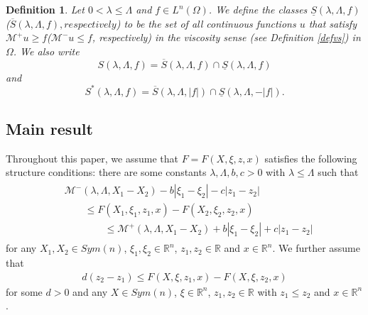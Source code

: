 \documentclass[11pt, reqno]{amsart}
\newtheorem{definition}[theorem]{Definition}
\numberwithin{equation}{section}
\begin{document}
\begin{definition}
Let $0 < \lambda \le \Lambda $ and $f \in L^{n}(\Omega) $.
We define the classes $\underline{S}(\lambda, \Lambda, f) $ ($ \overline{S}(\lambda, \Lambda,  f), respectively$) to be the set of all continuous functions $u$ that satisfy $ \mathcal{M}^{+}u \ge f$($ \mathcal{M}^{-}u \le f$, respectively) in the viscosity sense (see Definition \ref{defvs}) in $\Omega$.
We also write
$$S(\lambda, \Lambda,  f) =\overline{S}(\lambda, \Lambda, f) \cap \underline{S} (\lambda, \Lambda,  f)  $$
and
$$S^{\ast}(\lambda, \Lambda,  f) =\overline{S}(\lambda, \Lambda,| f|) \cap \underline{S} (\lambda, \Lambda,  -|f|) . $$
\end{definition}


\subsection{Main result}
Throughout this paper, we assume that $F=F(X,\xi,z,x)$ satisfies the following structure conditions:
there are some constants $\lambda, \Lambda, b,c>0$ with
$\lambda \le \Lambda$ such that
\begin{align} \label{ob_sc} \begin{split}
& \mathcal{M}^{-} (\lambda, \Lambda, X_{1}-X_{2}) -b|\xi_{1}-\xi_{2}| - c|z_{1}-z_{2}| \\ &
\qquad \le F(X_{1},\xi_{1},z_{1},x) - F(X_{2},\xi_{2},z_{2},x) \\ &
\qquad \qquad \le \mathcal{M}^{+} (\lambda, \Lambda, X_{1}-X_{2}) +b|\xi_{1}-\xi_{2}| + c|z_{1}-z_{2}|
\end{split}
\end{align}
for any $X_{1},X_{2} \in Sym(n)$, $\xi_{1},\xi_{2} \in \mathbb{R}^{n}$, $z_{1},z_{2} \in \mathbb{R}$ and $x \in \mathbb{R}^{n}$.
We further assume that
\begin{align} \label{foruni}
d(z_{2}-z_{1}) \le F(X,\xi,z_{1},x)-F(X,\xi,z_{2},x)
\end{align}
for some $d>0$ and any $X\in Sym(n)$, $\xi \in \mathbb{R}^{n}$, $z_{1},z_{2} \in \mathbb{R}$ with $z_{1}\le z_{2}$ and $x \in  \mathbb{R}^{n}$.
\end{document}
